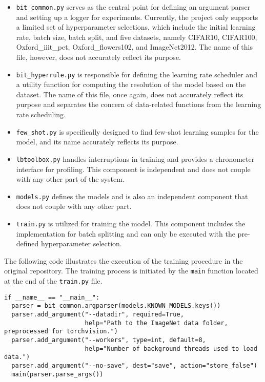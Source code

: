 \begin{itemize}
    \item \texttt{bit\_common.py} serves as the central point for defining an argument parser and setting up a logger for experiments. Currently, the project only supports a limited set of hyperparameter selections, which include the initial learning rate, batch size, batch split, and five datasets, namely CIFAR10, CIFAR100, Oxford\_iiit\_pet, Oxford\_flowers102, and ImageNet2012. The name of this file, however, does not accurately reflect its purpose.
    \item \texttt{bit\_hyperrule.py} is responsible for defining the learning rate scheduler and a utility function for computing the resolution of the model based on the dataset. The name of this file, once again, does not accurately reflect its purpose and separates the concern of data-related functions from the learning rate scheduling.
    \item \texttt{few\_shot.py} is specifically designed to find few-shot learning samples for the model, and its name accurately reflects its purpose.
    \item \texttt{lbtoolbox.py} handles interruptions in training and provides a chronometer interface for profiling. This component is independent and does not couple with any other part of the system.
    \item \texttt{models.py} defines the models and is also an independent component that does not couple with any other part.
    \item \texttt{train.py} is utilized for training the model. This component includes the implementation for batch splitting and can only be executed with the pre-defined hyperparameter selection.
\end{itemize}


The following code illustrates the execution of the training procedure in the original repository. The training process is initiated by the \texttt{main} function located at the end of the \texttt{train.py} file. 

\begin{verbatim}
if __name__ == "__main__":
  parser = bit_common.argparser(models.KNOWN_MODELS.keys())
  parser.add_argument("--datadir", required=True,
                      help="Path to the ImageNet data folder, preprocessed for torchvision.")
  parser.add_argument("--workers", type=int, default=8,
                      help="Number of background threads used to load data.")
  parser.add_argument("--no-save", dest="save", action="store_false")
  main(parser.parse_args())
\end{verbatim}

